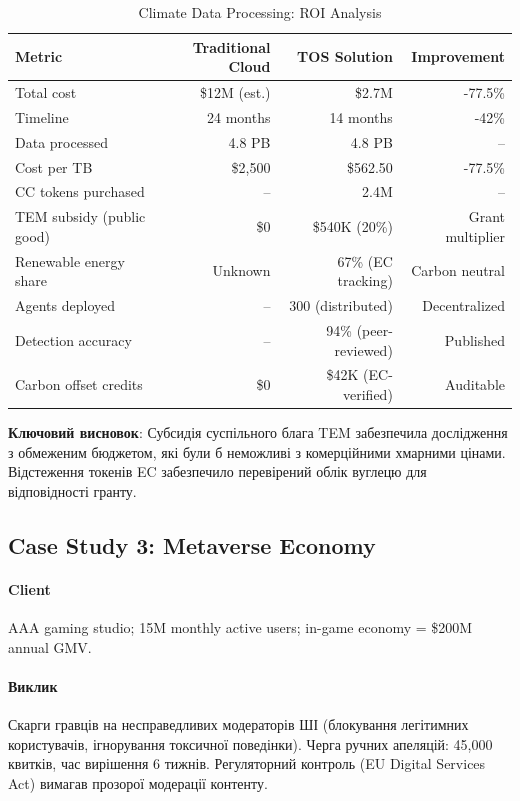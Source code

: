 \documentclass[11pt]{article}
\begin{document}
\begin{table}[H]
\centering
\caption{Climate Data Processing: ROI Analysis}
\label{tab:climate-roi}
\begin{tabular}{@{}lrrr@{}}
\toprule
\textbf{Metric} & \textbf{Traditional Cloud} & \textbf{TOS Solution} & \textbf{Improvement} \\ \midrule
Total cost & \$12M (est.) & \$2.7M & -77.5\% \\
Timeline & 24 months & 14 months & -42\% \\
Data processed & 4.8 PB & 4.8 PB & -- \\
Cost per TB & \$2,500 & \$562.50 & -77.5\% \\
CC tokens purchased & -- & 2.4M & -- \\
TEM subsidy (public good) & \$0 & \$540K (20\%) & Grant multiplier \\
Renewable energy share & Unknown & 67\% (EC tracking) & Carbon neutral \\
Agents deployed & -- & 300 (distributed) & Decentralized \\
Detection accuracy & -- & 94\% (peer-reviewed) & Published \\
Carbon offset credits & \$0 & \$42K (EC-verified) & Auditable \\
\bottomrule
\end{tabular}
\end{table}

\textbf{Ключовий висновок}: Субсидія суспільного блага TEM забезпечила дослідження з обмеженим бюджетом, які були б неможливі з комерційними хмарними цінами. Відстеження токенів EC забезпечило перевірений облік вуглецю для відповідності гранту.

\subsection{Case Study 3: Metaverse Economy}

\paragraph{Client} AAA gaming studio; 15M monthly active users; in-game economy = \$200M annual GMV.

\paragraph{Виклик} Скарги гравців на несправедливих модераторів ШІ (блокування легітимних користувачів, ігнорування токсичної поведінки). Черга ручних апеляцій: 45,000 квитків, час вирішення 6 тижнів. Регуляторний контроль (EU Digital Services Act) вимагав прозорої модерації контенту.
\end{document}
